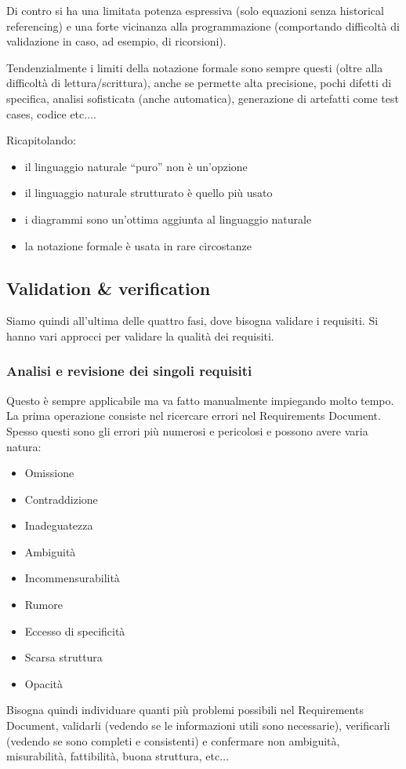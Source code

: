 Di contro si ha una limitata potenza espressiva (solo equazioni senza historical
referencing) e una forte vicinanza alla programmazione (comportando difficoltà
di validazione in caso, ad esempio, di ricorsioni).

Tendenzialmente i limiti della notazione formale sono sempre questi (oltre alla
difficoltà di lettura/scrittura), anche se permette alta precisione, pochi difetti
di specifica, analisi sofisticata (anche automatica), generazione di artefatti
come test cases, codice etc$\dots$.

Ricapitolando:
\begin{itemize}
    \item il linguaggio naturale “puro” non è un'opzione
    \item il linguaggio naturale strutturato è quello più usato
    \item i diagrammi sono un'ottima aggiunta al linguaggio naturale
    \item la notazione formale è usata in rare circostanze
\end{itemize}
\subsection{Validation \& verification}
Siamo quindi all'ultima delle quattro fasi, dove bisogna validare i requisiti.
Si hanno vari approcci per validare la qualità dei requisiti.
\subsubsection{Analisi e revisione dei singoli requisiti}
Questo è sempre applicabile ma va fatto manualmente impiegando molto tempo. La
prima operazione consiste nel ricercare errori nel Requirements Document. Spesso
questi sono gli errori più numerosi e pericolosi e possono avere varia natura:
\begin{itemize}
    \item Omissione
    \item Contraddizione
    \item Inadeguatezza
    \item Ambiguità
    \item Incommensurabilità
    \item Rumore
    \item Eccesso di specificità
    \item Scarsa struttura
    \item Opacità
\end{itemize}
Bisogna quindi individuare quanti più problemi possibili nel Requirements Document,
validarli (vedendo se le informazioni utili sono necessarie), verificarli (vedendo
se sono completi e consistenti) e confermare non ambiguità, misurabilità,
fattibilità, buona struttura, etc$\dots$


